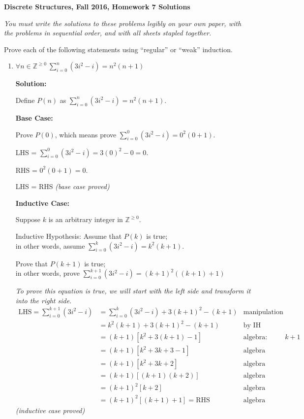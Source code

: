 \documentclass[11pt, letterpaper]{report}
\newcommand{\Z}{\mathbb{Z}}
\begin{document}
{\textbf{Discrete Structures, Fall 2016, Homework 7 Solutions}}

\medbreak

\textit{You must write the solutions to these problems legibly on your own paper, with
the problems in sequential order, and with all sheets stapled together.}

\bigskip

Prove each of the following statements using ``regular'' or ``weak'' induction.

\begin{enumerate}

       
\item $\forall n \in \Z^{\geq 0} \ \displaystyle \sum_{i=0}^n (3i^2-i) = n^2(n+1)$      
       
       
\textbf{Solution:}

Define $P(n)$ as $\displaystyle \sum_{i=0}^n (3i^2-i) = n^2(n+1)$.

\textbf{Base Case:}

Prove $P(0)$, which means prove $\displaystyle \sum_{i=0}^0 (3i^2-i) = 0^2(0+1)$.

LHS = $\displaystyle \sum_{i=0}^0 (3i^2-i) = 3(0)^2-0=0$.

RHS = $\displaystyle 0^2(0+1)=0$.

LHS = RHS \qquad \textit{(base case proved)}

\textbf{Inductive Case:}

Suppose $k$ is an arbitrary integer in $ \Z^{\geq 0}$.

\medskip

Inductive Hypothesis: Assume that $P(k)$ is true; \\in other words, assume
$\displaystyle \sum_{i=0}^k (3i^2-i) = k^2(k+1)$. 

Prove that $P(k+1)$ is true; \\ \medskip in other words, prove
$\displaystyle \sum_{i=0}^{k+1} (3i^2-i) = (k+1)^2((k+1)+1)$

\textit{To prove this equation is true, we will start with the left side and transform it 
into the right side.}
\begin{align*}
\text{LHS}=\sum_{i=0}^{k+1} (3i^2-i) & = \sum_{i=0}^{k} (3i^2-i) + 3(k+1)^2-(k+1) & \text{manipulation of a summation}\\
& = k^2(k+1) + 3(k+1)^2-(k+1) & \text{by IH}\\
& = (k+1)[k^2 + 3(k+1)-1] & \text{algebra: factor out $k+1$}\\
& = (k+1)[k^2 + 3k+3-1] & \text{algebra}\\
& = (k+1)[k^2 + 3k+2] & \text{algebra}\\
& = (k+1)[(k+1)(k+2)] & \text{algebra}\\
& = (k+1)^2[k+2] & \text{algebra}\\
& = (k+1)^2[(k+1)+1]=\text{RHS}& \text{algebra}
\end{align*}
\textit{(inductive case proved)}



\end{enumerate}
\end{document}
